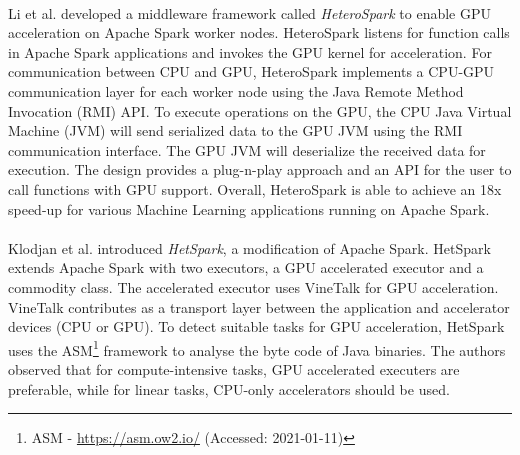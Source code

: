 \paragraph{}
Li et al. \cite{Li2015HeteroSpark} developed a middleware framework called \textit{HeteroSpark} to enable GPU acceleration on Apache Spark worker nodes. HeteroSpark listens for function calls in Apache Spark applications and invokes the GPU kernel for acceleration. For communication between CPU and GPU, HeteroSpark implements a CPU-GPU communication layer for each worker node using the Java Remote Method Invocation (RMI) API. To execute operations on the GPU, the CPU Java Virtual Machine (JVM) will send serialized data to the GPU JVM using the RMI communication interface. The GPU JVM will deserialize the received data for execution.
The design provides a plug-n-play approach and an API for the user to call functions with GPU support.
Overall, HeteroSpark is able to achieve an 18x speed-up for various Machine Learning applications running on Apache Spark.


\paragraph{}
Klodjan et al. \cite{Klodjan2018HetSpark} introduced \textit{HetSpark}, a modification of Apache Spark.
HetSpark extends Apache Spark with two executors, a GPU accelerated executor and a commodity class. 
The accelerated executor uses VineTalk\cite{Mavridis2017VineTalk} for GPU acceleration.
VineTalk contributes as a transport layer between the application and accelerator devices (CPU or GPU).
To detect suitable tasks for GPU acceleration, HetSpark uses the ASM\footnote{ASM - \url{https://asm.ow2.io/} (Accessed: 2021-01-11)} framework to analyse the byte code of Java binaries.
The authors observed that for compute-intensive tasks, GPU accelerated executers are preferable, while for linear tasks, CPU-only accelerators should be used.


